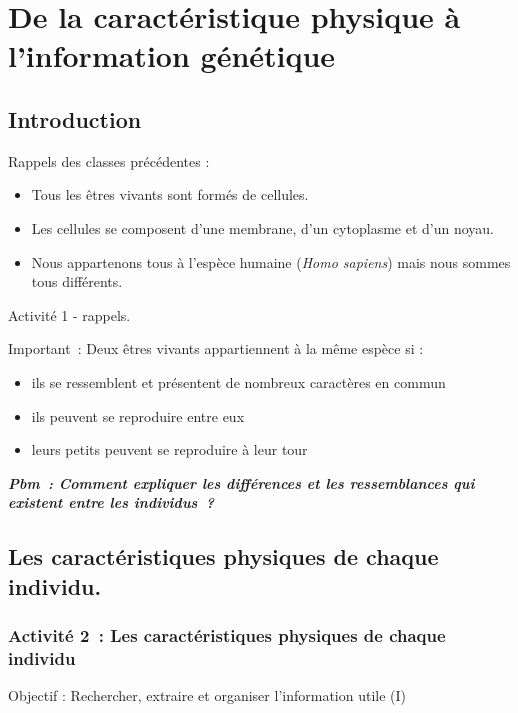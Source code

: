 %
\chapter{De la caractéristique physique à l'information génétique}
\label{sec:chap1}


\section*{Introduction}
Rappels des classes précédentes :
\begin{itemize}
\item
  Tous les êtres vivants sont formés de cellules.
\item
  Les cellules se composent d'une membrane, d'un cytoplasme et d'un
  noyau.
\item
  Nous appartenons tous à l'espèce humaine (\emph{Homo sapiens}) mais
  nous sommes tous différents.
\end{itemize}

Activité 1 - rappels.

Important~: Deux êtres vivants appartiennent à la même espèce si :
\begin{itemize}
\item
  ils se ressemblent et présentent de nombreux caractères en commun
\item
  ils peuvent se reproduire entre eux
\item
  leurs petits peuvent se reproduire à leur tour
\end{itemize}

\textbf{\emph{Pbm~: Comment expliquer les différences et les
ressemblances qui existent entre les individus~?}}


\section{Les caractéristiques physiques de chaque individu.}
\label{sec:chap1:caracteristiquesphysiques}

\subsection{Activité 2~: Les caractéristiques physiques de chaque individu}
Objectif : Rechercher, extraire et organiser l'information utile (I)

